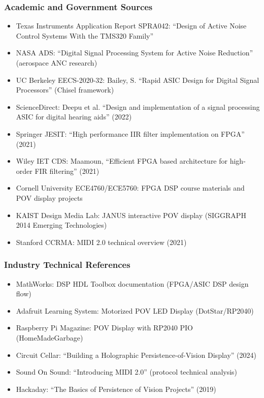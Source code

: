 \documentclass[11pt,letterpaper]{article}
\begin{document}
\subsubsection*{Academic and Government Sources}

\begin{itemize}[leftmargin=2em]
\item Texas Instruments Application Report SPRA042: ``Design of Active Noise Control Systems With the TMS320 Family''
\item NASA ADS: ``Digital Signal Processing System for Active Noise Reduction'' (aerospace ANC research)
\item UC Berkeley EECS-2020-32: Bailey, S. ``Rapid ASIC Design for Digital Signal Processors'' (Chisel framework)
\item ScienceDirect: Deepu et al. ``Design and implementation of a signal processing ASIC for digital hearing aids'' (2022)
\item Springer JESIT: ``High performance IIR filter implementation on FPGA'' (2021)
\item Wiley IET CDS: Maamoun, ``Efficient FPGA based architecture for high-order FIR filtering'' (2021)
\item Cornell University ECE4760/ECE5760: FPGA DSP course materials and POV display projects
\item KAIST Design Media Lab: JANUS interactive POV display (SIGGRAPH 2014 Emerging Technologies)
\item Stanford CCRMA: MIDI 2.0 technical overview (2021)
\end{itemize}

\subsubsection*{Industry Technical References}

\begin{itemize}[leftmargin=2em]
\item MathWorks: DSP HDL Toolbox documentation (FPGA/ASIC DSP design flow)
\item Adafruit Learning System: Motorized POV LED Display (DotStar/RP2040)
\item Raspberry Pi Magazine: POV Display with RP2040 PIO (HomeMadeGarbage)
\item Circuit Cellar: ``Building a Holographic Persistence-of-Vision Display'' (2024)
\item Sound On Sound: ``Introducing MIDI 2.0'' (protocol technical analysis)
\item Hackaday: ``The Basics of Persistence of Vision Projects'' (2019)
\end{itemize}
\end{document}
